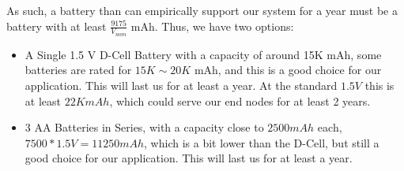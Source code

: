 As such, a battery than can empirically support our system for a year must be a battery with at least $\frac{9175}{V_{nom}}$ mAh. Thus, we have two options: 
\begin{itemize}
    \item A Single 1.5 V D-Cell Battery with a capacity of around 15K mAh, some batteries are rated for $15K \sim 20K$ mAh, and this is a good choice for our application. This will last us for at least a year. At the standard $1.5V$ this is at least $22K mAh$, which could serve our end nodes for at least 2 years.\cite{Dcell}
    \item 3 AA Batteries in Series, with a capacity close to $2500 mAh$ each, $7500 * 1.5 V = 11250 mAh$, which is a bit lower than the D-Cell, but still a good choice for our application. This will last us for at least a year.\cite{AA}
\end{itemize}




